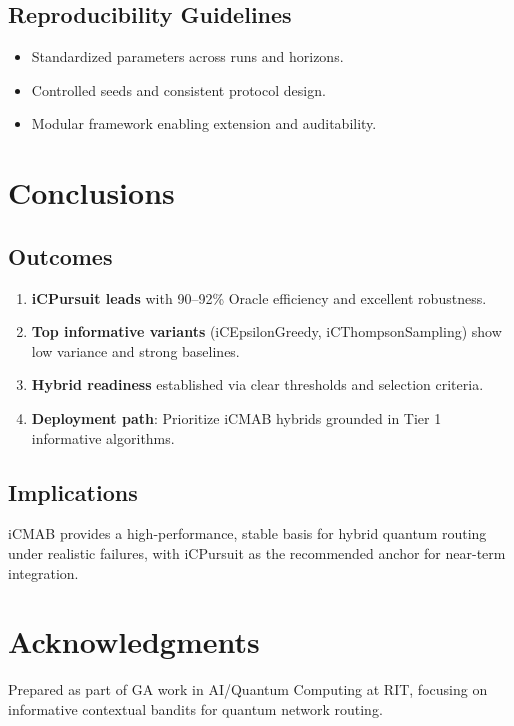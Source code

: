 \documentclass[12pt,a4paper]{article}
\newcommand{\primarytext}[1]{\textcolor{primaryblue}{\textbf{#1}}}
\newcommand{\secondarytext}[1]{\textcolor{secondaryblue}{\textbf{#1}}}
\newcommand{\success}[1]{\textcolor{accentgreen}{\textbf{#1}}}
\begin{document}
\subsection{Reproducibility Guidelines}
\begin{itemize}
\item Standardized parameters across runs and horizons.
\item Controlled seeds and consistent protocol design.
\item Modular framework enabling extension and auditability.
\end{itemize}

\newpage
\section{Conclusions}

\subsection{Outcomes}
\begin{enumerate}
\item \primarytext{iCPursuit leads} with 90–92\% Oracle efficiency and excellent robustness.
\item \success{Top informative variants} (iCEpsilonGreedy, iCThompsonSampling) show low variance and strong baselines.
\item \secondarytext{Hybrid readiness} established via clear thresholds and selection criteria.
\item \textbf{Deployment path}: Prioritize iCMAB hybrids grounded in Tier 1 informative algorithms.
\end{enumerate}

\subsection{Implications}
iCMAB provides a high-performance, stable basis for hybrid quantum routing under realistic failures, with iCPursuit as the recommended anchor for near-term integration.

\newpage
\section{Acknowledgments}
Prepared as part of GA work in AI/Quantum Computing at RIT, focusing on informative contextual bandits for quantum network routing.
\end{document}
